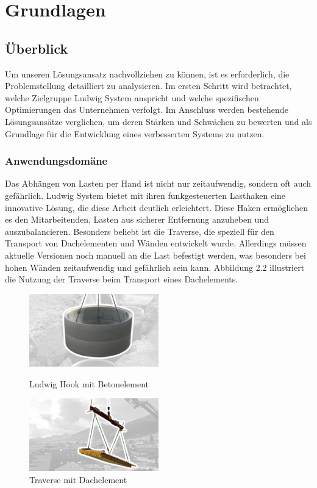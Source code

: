 \section{Grundlagen}

\subsection{Überblick}
Um unseren Lösungsansatz nachvollziehen zu können, ist es erforderlich, 
die Problemstellung detailliert zu analysieren. Im ersten Schritt wird betrachtet, 
welche Zielgruppe Ludwig System anspricht und welche spezifischen Optimierungen 
das Unternehmen verfolgt. Im Anschluss werden bestehende Lösungsansätze verglichen, 
um deren Stärken und Schwächen zu bewerten und als Grundlage 
für die Entwicklung eines verbesserten Systems zu nutzen.

\subsubsection{Anwendungsdomäne}
Das Abhängen von Lasten per Hand ist nicht nur zeitaufwendig, sondern oft auch gefährlich. 
Ludwig System bietet mit ihren funkgesteuerten Lasthaken eine innovative Lösung, 
die diese Arbeit deutlich erleichtert. Diese Haken ermöglichen es den Mitarbeitenden, 
Lasten aus sicherer Entfernung anzuheben und auszubalancieren. Besonders beliebt ist 
die Traverse, die speziell für den Transport von Dachelementen und Wänden entwickelt wurde. 
Allerdings müssen aktuelle Versionen noch manuell an die Last befestigt werden, 
was besonders bei hohen Wänden zeitaufwendig und gefährlich sein kann. 
Abbildung 2.2 illustriert die Nutzung der Traverse beim Transport eines Dachelements.

\begin{figure}[H]
    \centering
    \includegraphics[width=0.5\textwidth]{graphics/Betonelement.jpg}\hfill%
    \caption{Ludwig Hook mit Betonelement}
    \centering
    \includegraphics[width=0.5\textwidth]{graphics/Traverse.jpg}
    \caption{Traverse mit Dachelement}
\end{figure}

